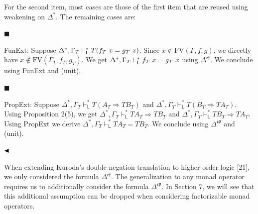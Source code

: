 \documentclass[10pt,a4paper]{article}
\begin{document}
 
  
For the second item, most cases are those of the first item that are reused using weakening on $\Delta^{*}$. The remaining cases are:\par
  
\par\noindent  $\blacksquare$ 
 
FunExt: Suppose $\Delta^{*},\Gamma_{T}\vdash_{\mathsf{L}}^{*}T(f_{T}\leavevmode\nobreak\ x=g_{T}\leavevmode\nobreak\ x)$. Since $x\notin\text{{FV}}(\Gamma,f,g)$, we directly have $x\notin\text{{FV}}(\Gamma_{T},f_{T},g_{T})$. We get $\Delta^{*},\Gamma_{T}\vdash_{\mathsf{L}}^{*}f_{T}\leavevmode\nobreak\ x=g_{T}\leavevmode\nobreak\ x$ using $\Delta^{\mathfrak{e}\mathfrak{f}}$. We conclude using FunExt and (unit).\par
 
 
 
\par\noindent  $\blacksquare$ 
 
PropExt: Suppose $\Delta^{*},\Gamma_{T}\vdash_{\mathsf{L}}^{*}T(A_{T}\mathbin{\Rightarrow}TB_{T})$ and $\Delta^{*},\Gamma_{T}\vdash_{\mathsf{L}}^{*}T(B_{T}\mathbin{\Rightarrow}TA_{T})$. Using Proposition 2(5), we get $\Delta^{*},\Gamma_{T}\vdash_{\mathsf{L}}^{*}TA_{T}\mathbin{\Rightarrow}TB_{T}$ and $\Delta^{*},\Gamma_{T}\vdash_{\mathsf{L}}^{*}TB_{T}\mathbin{\Rightarrow}TA_{T}$. Using PropExt we derive $\Delta^{*},\Gamma_{T}\vdash_{\mathsf{L}}^{*}TA_{T}=TB_{T}$. We conclude using $\Delta^{\mathfrak{e}\mathfrak{p}}$ and (unit).\par
 
 
  
$\hfill\blacktriangleleft$\par
 
 
 
When extending Kuroda’s double-negation translation to higher-order logic [21], we only considered the formula $\Delta^{\mathfrak{e}\mathfrak{f}}$. The generalization to any monad operator requires us to additionally consider the formula $\Delta^{\mathfrak{e}\mathfrak{p}}$. In Section 7, we will see that this additional assumption can be dropped when considering factorizable monad operators.\par
 
 
\end{document}
